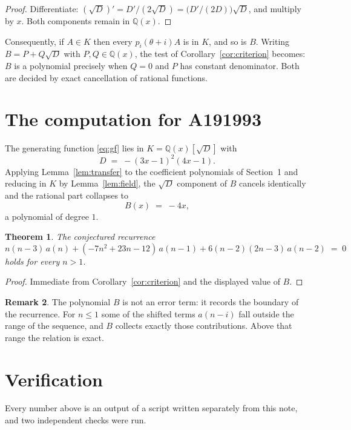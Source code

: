 \documentclass[11pt,a4paper]{article}
\theoremstyle{plain}
\newtheorem{theorem}{Theorem}
\theoremstyle{definition}
\newtheorem{remark}[theorem]{Remark}
\begin{document}
\begin{proof}
Differentiate: $(\sqrt{D})'=D'/(2\sqrt{D})=\bigl(D'/(2D)\bigr)\sqrt{D}$, and multiply by
$x$. Both components remain in $\mathbb{Q}(x)$.
\end{proof}

Consequently, if $A\in K$ then every $p_{i}(\theta+i)A$ is in $K$, and so is $B$. Writing
$B=P+Q\sqrt{D}$ with $P,Q\in\mathbb{Q}(x)$, the test of Corollary~\ref{cor:criterion}
becomes: $B$ is a polynomial precisely when $Q=0$ and $P$ has constant denominator. Both
are decided by exact cancellation of rational functions.

\section{The computation for A191993}

The generating function \eqref{eq:gf} lies in $K=\mathbb{Q}(x)[\sqrt{D}]$ with
\[
D \;=\; - \left(3 x - 1\right)^{2} \left(4 x - 1\right) .
\]
Applying Lemma~\ref{lem:transfer} to the coefficient polynomials of Section~1 and reducing
in $K$ by Lemma~\ref{lem:field}, the $\sqrt{D}$ component of $B$ cancels identically and
the rational part collapses to
\[
B(x)\;=\;- 4 x ,
\]
a polynomial of degree $1$.

\begin{theorem}
The conjectured recurrence
\[
n \left(n - 3\right)\,a(n) + (- 7 n^{2} + 23 n - 12)\,a(n-1) + 6 \left(n - 2\right) \left(2 n - 3\right)\,a(n-2) \;=\;0
\]
holds for every $n>1$.
\end{theorem}

\begin{proof}
Immediate from Corollary~\ref{cor:criterion} and the displayed value of $B$.
\end{proof}

\begin{remark}
The polynomial $B$ is not an error term: it records the boundary of the recurrence. For
$n\le1$ some of the shifted terms $a(n-i)$ fall outside the range of the sequence,
and $B$ collects exactly those contributions. Above that range the relation is exact.
\end{remark}

\section{Verification}

Every number above is an output of a script written separately from this note, and two
independent checks were run.
\end{document}
